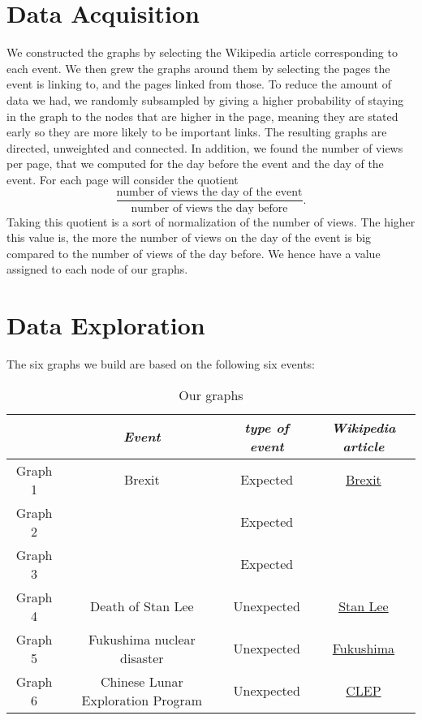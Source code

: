 \documentclass[conference]{IEEEtran}
\begin{document}
\section{Data Acquisition}

We constructed the graphs by selecting the Wikipedia article corresponding to each event. We then grew the graphs around them by selecting the pages the event is linking to, and the pages linked from those. To reduce the amount of data we had, we randomly subsampled by giving a higher probability of staying in the graph to the nodes that are higher in the page, meaning they are stated early so they are more likely to be important links. The resulting graphs are directed, unweighted and connected. In addition, we found the number of views per page, that we computed for the day before the event and the day of the event. 
For each page will consider the quotient \[\frac{\text{number of views the day of the event} }{\text{number of views the day before}}.\]  Taking this quotient is a sort of normalization of the number of views. The higher this value is, the more the number of views on the day of the event is big compared to the number of views of the day before. We hence have a value assigned to each node of our graphs. 


\section{Data Exploration}


The six graphs we build are based on the following six events: 


\begin{table}[htbp]
\caption{Our graphs}
\begin{center}
\begin{tabular}{|c|c|c|c|}
\hline
\textbf{ } & \textbf{\textit{Event}}& \textbf{\textit{type of event}}& \textbf{\textit{Wikipedia article}} \\
\hline
Graph 1 & Brexit  &Expected & \href{https://en.wikipedia.org/wiki/Brexit}{Brexit}\\
\hline
Graph 2&   &Expected & \\
\hline
Graph 3&  & Expected& \\
\hline
Graph 4 & Death of Stan Lee & Unexpected & \href{ https://en.wikipedia.org/wiki/Stan_Lee }{Stan Lee} \\
\hline
Graph 5& Fukushima nuclear disaster& Unexpected & \href{https://en.wikipedia.org/wiki/Fukushima_Daiichi_nuclear_disaster }{Fukushima}\\
\hline
Graph 6 & Chinese Lunar Exploration  Program & Unexpected &  \href{https://en.wikipedia.org/wiki/Chinese_Lunar_Exploration_Program }{CLEP}\\
\hline
\end{tabular}
\end{center}
\end{table}
\end{document}
